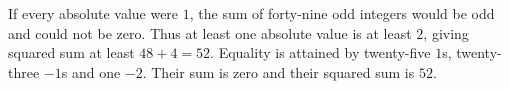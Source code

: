 If every absolute value were $1$, the sum of forty-nine odd integers would be odd and could not be zero. Thus at least one absolute value is at least $2$, giving squared sum at least $48+4=52$. Equality is attained by twenty-five $1$s, twenty-three $-1$s and one $-2$. Their sum is zero and their squared sum is $\boxed{52}$.

